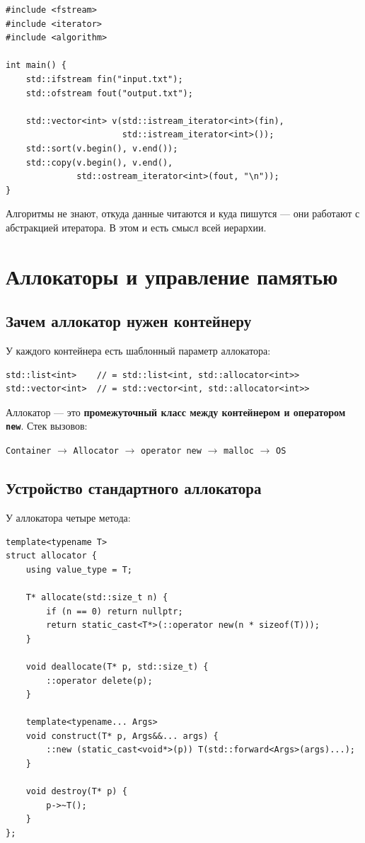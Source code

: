 \documentclass[a4paper,12pt]{article}
\begin{document}
\begin{lstlisting}
#include <fstream>
#include <iterator>
#include <algorithm>

int main() {
    std::ifstream fin("input.txt");
    std::ofstream fout("output.txt");

    std::vector<int> v(std::istream_iterator<int>(fin),
                       std::istream_iterator<int>());
    std::sort(v.begin(), v.end());
    std::copy(v.begin(), v.end(),
              std::ostream_iterator<int>(fout, "\n"));
}
\end{lstlisting}

Алгоритмы не знают, откуда данные читаются и куда пишутся --- они
работают с абстракцией итератора. В этом и есть смысл всей иерархии.

\newpage
\section{Аллокаторы и управление памятью}

\subsection{Зачем аллокатор нужен контейнеру}

У каждого контейнера есть шаблонный параметр аллокатора:

\begin{lstlisting}
std::list<int>    // = std::list<int, std::allocator<int>>
std::vector<int>  // = std::vector<int, std::allocator<int>>
\end{lstlisting}

Аллокатор --- это \textbf{промежуточный класс между контейнером и
оператором \texttt{new}}. Стек вызовов:

\begin{center}
\texttt{Container} $\to$ \texttt{Allocator} $\to$
\texttt{operator new} $\to$ \texttt{malloc} $\to$ \texttt{OS}
\end{center}

\subsection{Устройство стандартного аллокатора}

У аллокатора четыре метода:

\begin{lstlisting}
template<typename T>
struct allocator {
    using value_type = T;

    T* allocate(std::size_t n) {
        if (n == 0) return nullptr;
        return static_cast<T*>(::operator new(n * sizeof(T)));
    }

    void deallocate(T* p, std::size_t) {
        ::operator delete(p);
    }

    template<typename... Args>
    void construct(T* p, Args&&... args) {
        ::new (static_cast<void*>(p)) T(std::forward<Args>(args)...);
    }

    void destroy(T* p) {
        p->~T();
    }
};
\end{lstlisting}
\end{document}
